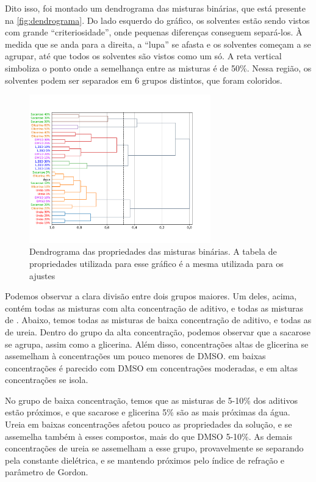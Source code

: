 		Dito isso, foi montado um dendrograma das misturas binárias, que está presente na \autoref{fig:dendrograma}. Do lado esquerdo do gráfico, os solventes estão sendo vistos com grande ``criteriosidade'', onde pequenas diferenças conseguem separá-los. À medida que se anda para a direita, a ``lupa'' se afasta e os solventes começam a se agrupar, até que todos os solventes são vistos como um só. A reta vertical simboliza o ponto onde a semelhança entre as misturas é de 50\%. Nessa região, os solventes podem ser separados em 6 grupos distintos, que foram coloridos.\cite{MarciaQuimiometria}
		
		\begin{figure}[h]
			\centering
			\includegraphics[width=0.7\textwidth]{imagens/propriedades/dendrograma}
			\caption{Dendrograma das propriedades das misturas binárias. A tabela de propriedades utilizada para esse gráfico é a mesma utilizada para os ajustes}
			\label{fig:dendrograma}
		\end{figure}
		
		Podemos observar a clara divisão entre dois grupos maiores. Um deles, acima, contém todas as misturas com alta concentração de aditivo, e todas as misturas de \BD{}. Abaixo, temos todas as misturas de baixa concentração de aditivo, e todas as de ureia. Dentro do grupo da alta concentração, podemos observar que a sacarose se agrupa, assim como a glicerina. Além disso, concentrações altas de glicerina se assemelham à concentrações um pouco menores de DMSO. \BD{} em baixas concentrações é parecido com DMSO em concentrações moderadas, e \BD{} em altas concentrações se isola.
		
		No grupo de baixa concentração, temos que as misturas de 5-10\% dos aditivos estão próximos, e que sacarose e glicerina 5\% são as mais próximas da água. Ureia em baixas concentrações afetou pouco as propriedades da solução, e se assemelha também à esses compostos, mais do que DMSO 5-10\%. As demais concentrações de ureia se assemelham a esse grupo, provavelmente se separando pela constante dielétrica, e se mantendo próximos pelo índice de refração e parâmetro de Gordon.
		
